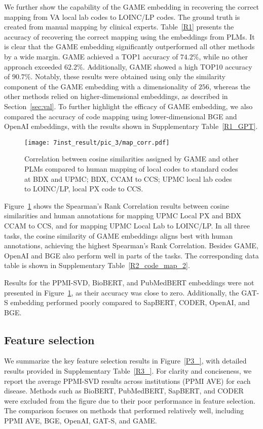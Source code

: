 \documentclass{article}
\begin{document}
We further show the capability of the GAME embedding in recovering the correct mapping
from VA local lab codes to LOINC/LP codes.
The ground truth is created from manual mapping by clinical experts.
Table~\ref{R1} presents the accuracy of recovering the correct mapping using the embeddings from PLMs.
It is clear that the GAME embedding significantly outperformed all other methods by a wide margin.
GAME achieved a TOP1 accuracy of $74.2\%$, while no other approach exceeded $62.2\%$.
Additionally, GAME showed a high TOP10 accuracy of $90.7\%$.
Notably, these results were obtained using only the similarity component of the GAME embedding with a dimensionality of $256$, whereas the other methods relied on higher-dimensional embeddings, as described in Section~\ref{sec:val}. To further highlight the efficacy of GAME embedding, we also compared the accuracy of code mapping using lower-dimensional BGE and OpenAI embeddings, with the results shown in Supplementary Table~\ref{R1_GPT}.

\begin{figure}[!ht]
    \centering
    \texttt{[image: 7inst\_result/pic\_3/map\_corr.pdf]}
    \caption{Correlation between cosine similarities assigned by GAME and other PLMs compared to human mapping of local codes to standard codes at BDX and UPMC; BDX, CCAM to CCS; UPMC local lab codes to LOINC/LP, local PX code to CCS.}
    \label{fig:code_map_corr}
\end{figure}

Figure~\ref{fig:code_map_corr} shows the Spearman's Rank Correlation results between cosine similarities and human annotations for mapping UPMC Local PX and BDX CCAM to CCS, and for mapping UPMC Local Lab to LOINC/LP. In all three tasks, the cosine similarity of GAME embeddings aligns best with human annotations, achieving the highest Spearman's Rank Correlation. Besides GAME, OpenAI and BGE also perform well in parts of the tasks. The corresponding data table is shown in Supplementary Table~\ref{R2_code_map_2}.

Results for the PPMI-SVD, BioBERT, and PubMedBERT embeddings were not presented in Figure~\ref{fig:code_map_corr}, as their accuracy was close to zero. Additionally, the GAT-S embedding performed poorly compared to SapBERT, CODER, OpenAI, and BGE.


\subsection{Feature selection}
We summarize the key feature selection results in Figure~\ref{P3_}, with detailed results provided in Supplementary Table~\ref{R3_}. For clarity and conciseness, we report the average PPMI-SVD results across institutions (PPMI AVE) for each disease. Methods such as BioBERT, PubMedBERT, SapBERT, and CODER were excluded from the figure due to their poor performance in feature selection. The comparison focuses on methods that performed relatively well, including PPMI AVE, BGE, OpenAI, GAT-S, and GAME.
\end{document}
